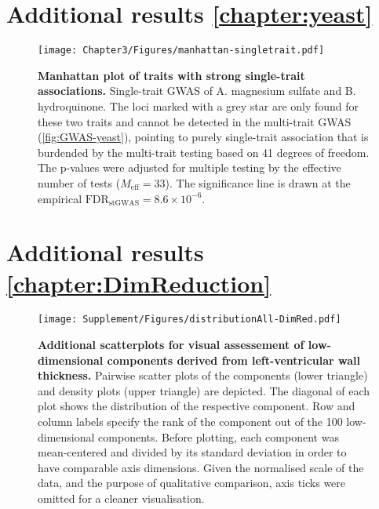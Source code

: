 \newpage
\section{Additional results \cref{chapter:yeast}}
\begin{figure}[hbtp]
	\centering
	\texttt{[image: Chapter3/Figures/manhattan-singletrait.pdf]}
	\caption[\textbf{Manhattan plot of traits with strong single-trait associations.}]{\textbf{Manhattan plot of traits with strong single-trait associations.} Single-trait GWAS of A. magnesium sulfate and B. hydroquinone. The loci marked with a grey star are only found for these two traits and cannot be detected in the multi-trait GWAS (\cref{fig:GWAS-yeast}), pointing to purely single-trait association that is burdended by the multi-trait testing based on \num{41} degrees of freedom. The  p-values were adjusted for multiple testing by the effective number of tests (\(M_\text{eff} = 33\)). The significance line is drawn at the empirical \(\text{FDR}_{\text{stGWAS}} =8.6 \times 10^{-6}\).}
 	\label{fig:stGWAS-yeast}
\end{figure}

\newpage
\section{Additional results \cref{chapter:DimReduction}}
\begin{figure}[hbtp]
	\centering
	\texttt{[image: Supplement/Figures/distributionAll-DimRed.pdf]}
	\caption[\textbf{Additional scatterplots for visual assessement of low-dimensional components derived from left-ventricular wall thickness. }]{\textbf{Additional scatterplots for visual assessement of low-dimensional components derived from left-ventricular wall thickness. }Pairwise scatter plots of the components (lower triangle) and density plots (upper triangle) are depicted. The diagonal of each plot shows the distribution of the respective component. Row and column labels specify the rank of the component out of the \num{100} low-dimensional components. Before plotting, each component was mean-centered and divided by its standard deviation in order to have comparable axis dimensions. Given the normalised scale of the data, and the purpose of qualitative comparison, axis ticks were omitted for a cleaner visualisation. }
	 	\label{fig:distributionAll-DimRed}
\end{figure}

